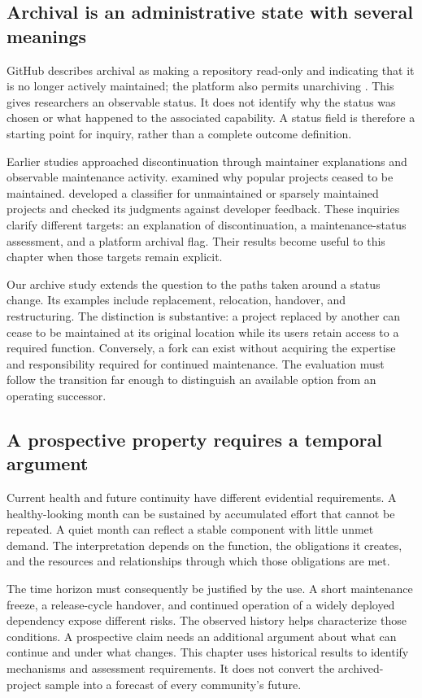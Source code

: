 \subsection{Archival is an administrative state with several meanings}
GitHub describes archival as making a repository read-only and indicating that it is no longer actively maintained; the platform also permits unarchiving \citep{githubarchive}. This gives researchers an observable status. It does not identify why the status was chosen or what happened to the associated capability. A status field is therefore a starting point for inquiry, rather than a complete outcome definition.

Earlier studies approached discontinuation through maintainer explanations and observable maintenance activity. \citet{coelho2017} examined why popular projects ceased to be maintained. \citet{coelho2018} developed a classifier for unmaintained or sparsely maintained projects and checked its judgments against developer feedback. These inquiries clarify different targets: an explanation of discontinuation, a maintenance-status assessment, and a platform archival flag. Their results become useful to this chapter when those targets remain explicit.

Our archive study extends the question to the paths taken around a status change. Its examples include replacement, relocation, handover, and restructuring. The distinction is substantive: a project replaced by another can cease to be maintained at its original location while its users retain access to a required function. Conversely, a fork can exist without acquiring the expertise and responsibility required for continued maintenance. The evaluation must follow the transition far enough to distinguish an available option from an operating successor.

\subsection{A prospective property requires a temporal argument}
Current health and future continuity have different evidential requirements. A healthy-looking month can be sustained by accumulated effort that cannot be repeated. A quiet month can reflect a stable component with little unmet demand. The interpretation depends on the function, the obligations it creates, and the resources and relationships through which those obligations are met.

The time horizon must consequently be justified by the use. A short maintenance freeze, a release-cycle handover, and continued operation of a widely deployed dependency expose different risks. The observed history helps characterize those conditions. A prospective claim needs an additional argument about what can continue and under what changes. This chapter uses historical results to identify mechanisms and assessment requirements. It does not convert the archived-project sample into a forecast of every community's future.

